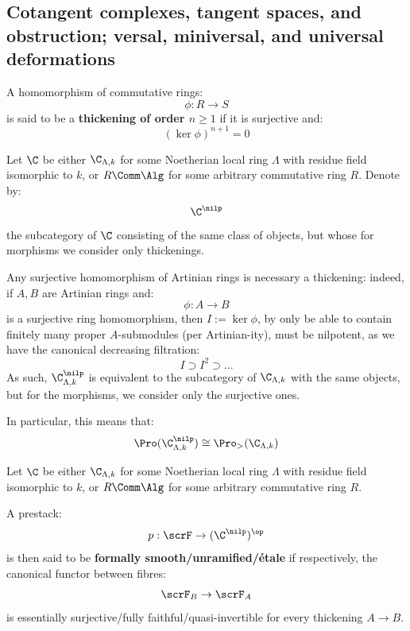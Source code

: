     \subsection{Cotangent complexes, tangent spaces, and obstruction; versal, miniversal, and universal deformations}
        \begin{definition}[Thickenings] \label{def: thickenings}
            A homomorphism of commutative rings:
                $$\phi: R \to S$$
            is said to be a \textbf{thickening of order $n \geq 1$} if it is surjective and:
                $$(\ker \phi)^{n + 1} = 0$$
        \end{definition}
        \begin{convention}
            Let $\C$ be either $\C_{\Lambda, k}$ for some Noetherian local ring $\Lambda$ with residue field isomorphic to $k$, or $R\-\Comm\Alg$ for some arbitrary commutative ring $R$. Denote by:
                $$\C^{\nilp}$$
            the subcategory of $\C$ consisting of the same class of objects, but whose for morphisms we consider only thickenings.
        \end{convention}
        \begin{remark}
            Any surjective homomorphism of Artinian rings is necessary a thickening: indeed, if $A, B$ are Artinian rings and:
                $$\phi: A \to B$$
            is a surjective ring homomorphism, then $I := \ker \phi$, by only be able to contain finitely many proper $A$-submodules (per Artinian-ity), must be nilpotent, as we have the canonical decreasing filtration:
                $$I \supset I^2 \supset ...$$
            As such, $\C_{\Lambda, k}^{\nilp}$ is equivalent to the subcategory of $\C_{\Lambda, k}$ with the same objects, but for the morphisms, we consider only the surjective ones.

            In particular, this means that:
                $$\Pro(\C_{\Lambda, k}^{\nilp}) \cong \Pro_{>}(\C_{\Lambda, k})$$
        \end{remark}
        \begin{definition} \label{def: formally_smooth_unramified_and_etale_prestacks}
            Let $\C$ be either $\C_{\Lambda, k}$ for some Noetherian local ring $\Lambda$ with residue field isomorphic to $k$, or $R\-\Comm\Alg$ for some arbitrary commutative ring $R$.
            
            A prestack:
                $$p: \scrF \to (\C^{\nilp})^{\op}$$
            is then said to be \textbf{formally smooth/unramified/\'etale} if respectively, the canonical functor between fibres:
                $$\scrF_B \to \scrF_A$$
            is essentially surjective/fully faithful/quasi-invertible for every thickening $A \to B$.
        \end{definition}
